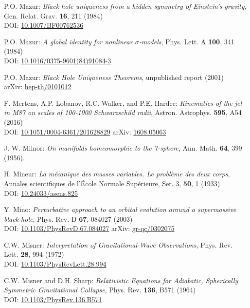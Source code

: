 \begin{thebibliography}{123}
P.O. Mazur:
{\em Black hole uniqueness from a hidden symmetry of Einstein's gravity},
Gen. Relat. Grav. {\bf 16}, 211 (1984)\\
DOI: \href{https://doi.org/10.1007/BF00762536}{10.1007/BF00762536}

P.O. Mazur:
{\em A global identity for nonlinear $\sigma$-models},
Phys. Lett. A {\bf 100}, 341 (1984)\\
DOI: \href{https://doi.org/10.1016/0375-9601(84)91084-3}{10.1016/0375-9601(84)91084-3}

P.O. Mazur:
{\em Black Hole Uniqueness Theorems},
unpublished report (2001)\\
arXiv: \href{https://arxiv.org/abs/hep-th/0101012}{hep-th/0101012}

F. Mertens, A.P. Lobanov, R.C. Walker, and P.E. Hardee:
{\em Kinematics of the jet in M87 on scales of 100-1000 Schwarzschild radii},
Astron. Astrophys. {\bf 595}, A54 (2016)\\
DOI: \href{https://doi.org/10.1051/0004-6361/201628829}{10.1051/0004-6361/201628829}\hfill
arXiv: \href{https://arxiv.org/abs/1608.05063}{1608.05063}

J. W. Milnor: {\em On manifolds homeomorphic to the 7-sphere},
Ann. Math. {\bf 64}, 399 (1956).

H. Mineur: {\em La mécanique des masses variables. Le problème des deux corps},
Annales scientifiques de l'École Normale Supérieure, Ser. 3, {\bf 50}, 1 (1933)\\
DOI: \href{https://doi.org/10.24033/asens.825}{10.24033/asens.825}

Y. Mino:
{\em Perturbative approach to an orbital evolution around a supermassive black hole},
Phys. Rev. D {\bf 67}, 084027 (2003)\\
DOI: \href{https://doi.org/10.1103/PhysRevD.67.084027}{10.1103/PhysRevD.67.084027}\hfill
arXiv: \href{https://arxiv.org/abs/gr-qc/0302075}{gr-qc/0302075}

C.W. Misner:
{\em Interpretation of Gravitational-Wave Observations},
Phys. Rev. Lett. {\bf 28}, 994 (1972)\\
DOI: \href{https://doi.org/10.1103/PhysRevLett.28.994}{10.1103/PhysRevLett.28.994}

C.W. Misner and D.H. Sharp:
{\em Relativistic Equations for Adiabatic, Spherically Symmetric Gravitational Collapse},
Phys. Rev. {\bf 136}, B571 (1964)\\
DOI: \href{https://doi.org/10.1103/PhysRev.136.B571}{10.1103/PhysRev.136.B571}


\end{thebibliography}
